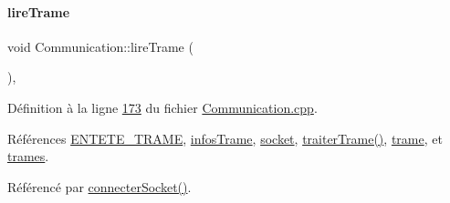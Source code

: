 \paragraph{\texorpdfstring{lire\+Trame}{lireTrame}}
{\footnotesize\ttfamily void Communication\+::lire\+Trame (\begin{DoxyParamCaption}{ }\end{DoxyParamCaption})\hspace{0.3cm}{\ttfamily [private]}, {\ttfamily [slot]}}



Définition à la ligne \hyperlink{_communication_8cpp_source_l00173}{173} du fichier \hyperlink{_communication_8cpp_source}{Communication.\+cpp}.



Références \hyperlink{_communication_8h_source_l00019}{E\+N\+T\+E\+T\+E\+\_\+\+T\+R\+A\+ME}, \hyperlink{_communication_8h_source_l00058}{infos\+Trame}, \hyperlink{_communication_8h_source_l00052}{socket}, \hyperlink{_communication_8cpp_source_l00208}{traiter\+Trame()}, \hyperlink{_communication_8h_source_l00056}{trame}, et \hyperlink{_communication_8h_source_l00057}{trames}.



Référencé par \hyperlink{_communication_8cpp_source_l00116}{connecter\+Socket()}.


